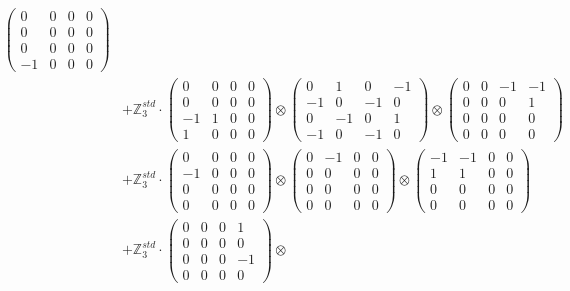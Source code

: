 \documentclass{article}
\begin{document}
{\begin{align}
            \begin{pmatrix} 0 & 0 & 0 & 0 \\ 0 & 0 & 0 & 0 \\ 0 & 0 & 0 & 0 \\ -1 & 0 & 0 & 0 \end{pmatrix} \\ 
        &+ \label{Rs16-Rc11-Solution-27-c25} \mathbb{Z}_3^{std} \cdot 
            \begin{pmatrix} 0 & 0 & 0 & 0 \\ 0 & 0 & 0 & 0 \\ -1 & 1 & 0 & 0 \\ 1 & 0 & 0 & 0 \end{pmatrix} \otimes 
            \begin{pmatrix} 0 & 1 & 0 & -1 \\ -1 & 0 & -1 & 0 \\ 0 & -1 & 0 & 1 \\ -1 & 0 & -1 & 0 \end{pmatrix} \otimes 
            \begin{pmatrix} 0 & 0 & -1 & -1 \\ 0 & 0 & 0 & 1 \\ 0 & 0 & 0 & 0 \\ 0 & 0 & 0 & 0 \end{pmatrix} \\ 
        &+ \label{Rs16-Rc11-Solution-27-c26} \mathbb{Z}_3^{std} \cdot 
            \begin{pmatrix} 0 & 0 & 0 & 0 \\ -1 & 0 & 0 & 0 \\ 0 & 0 & 0 & 0 \\ 0 & 0 & 0 & 0 \end{pmatrix} \otimes 
            \begin{pmatrix} 0 & -1 & 0 & 0 \\ 0 & 0 & 0 & 0 \\ 0 & 0 & 0 & 0 \\ 0 & 0 & 0 & 0 \end{pmatrix} \otimes 
            \begin{pmatrix} -1 & -1 & 0 & 0 \\ 1 & 1 & 0 & 0 \\ 0 & 0 & 0 & 0 \\ 0 & 0 & 0 & 0 \end{pmatrix} \\ 
        &+ \label{Rs16-Rc11-Solution-27-c27} \mathbb{Z}_3^{std} \cdot 
            \begin{pmatrix} 0 & 0 & 0 & 1 \\ 0 & 0 & 0 & 0 \\ 0 & 0 & 0 & -1 \\ 0 & 0 & 0 & 0 \end{pmatrix} \otimes 

\end{align}}
\end{document}
